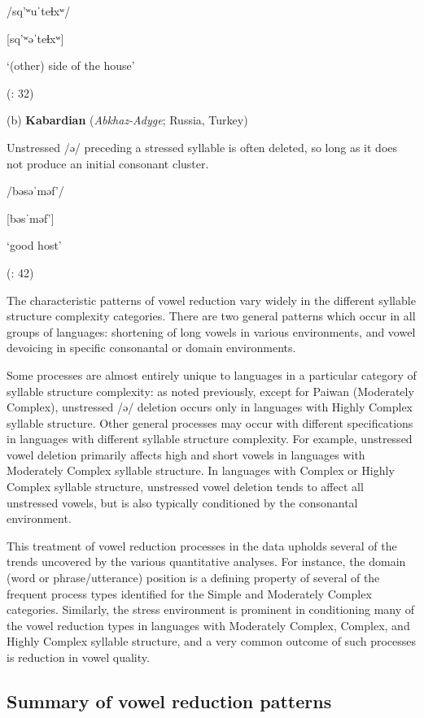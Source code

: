 /sq’ʷuˈteɬxʷ/

[sq’ʷəˈteɬxʷ]

\glt ‘(other) side of the house’

(\citealt{ThompsonThompson1992}: 32)

(b)  \textbf{Kabardian} (\textit{Abkhaz-Adyge}; Russia, Turkey) 

Unstressed /ə/ preceding a stressed syllable is often deleted, so long as it does not produce an initial consonant cluster.

/bəsəˈməf’/

[bəsˈməf’]

\glt ‘good host’

(\citealt{GordonApplebaum2010}: 42)
\z

  The characteristic patterns of vowel reduction vary widely in the different syllable structure complexity categories. There are two general patterns which occur in all groups of languages: shortening of long vowels in various environments, and vowel devoicing in specific consonantal or domain environments. 

  Some processes are almost entirely unique to languages in a particular category of syllable structure complexity: as noted previously, except for Paiwan (Moderately Complex), unstressed /ə/ deletion occurs only in languages with Highly Complex syllable structure. Other general processes may occur with different specifications in languages with different syllable structure complexity. For example, unstressed vowel deletion primarily affects high and short vowels in languages with Moderately Complex syllable structure. In languages with Complex or Highly Complex syllable structure, unstressed vowel deletion tends to affect all unstressed vowels, but is also typically conditioned by the consonantal environment.

  This treatment of vowel reduction processes in the data upholds several of the trends uncovered by the various quantitative analyses. For instance, the domain (word or phrase/utterance) position is a defining property of several of the frequent process types identified for the Simple and Moderately Complex categories. Similarly, the stress environment is prominent in conditioning many of the vowel reduction types in languages with Moderately Complex, Complex, and Highly Complex syllable structure, and a very common outcome of such processes is reduction in vowel quality.

\subsection{Summary of vowel reduction patterns}\label{sec:6.3.7}


